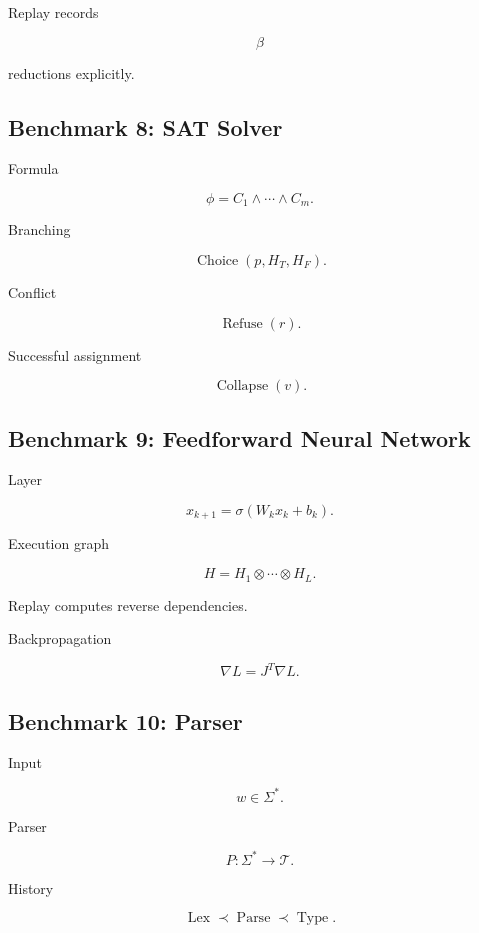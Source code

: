\documentclass[12pt,oneside]{article}
\theoremstyle{definition}
\theoremstyle{remark}
\begin{document}
Replay records

\[
\beta
\]

reductions explicitly.

\subsection*{Benchmark 8: SAT Solver}

Formula

\[
\phi
=
C_1
\land
\cdots
\land
C_m.
\]

Branching

\[
\operatorname{Choice}
(
p,
H_T,
H_F
).
\]

Conflict

\[
\operatorname{Refuse}(r).
\]

Successful assignment

\[
\operatorname{Collapse}(v).
\]

\subsection*{Benchmark 9: Feedforward Neural Network}

Layer

\[
x_{k+1}
=
\sigma(W_kx_k+b_k).
\]

Execution graph

\[
H
=
H_1
\otimes
\cdots
\otimes
H_L.
\]

Replay computes reverse dependencies.

Backpropagation

\[
\nabla
L
=
J^T
\nabla
L.
\]

\subsection*{Benchmark 10: Parser}

Input

\[
w
\in
\Sigma^*.
\]

Parser

\[
P
:
\Sigma^*
\rightarrow
\mathcal T.
\]

History

\[
\operatorname{Lex}
\prec
\operatorname{Parse}
\prec
\operatorname{Type}.
\]
\end{document}
